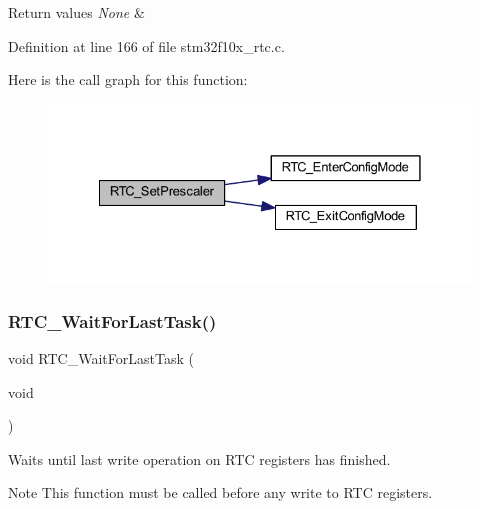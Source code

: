 \begin{DoxyRetVals}{Return values}
{\em None} & \\
\hline
\end{DoxyRetVals}


Definition at line 166 of file stm32f10x\+\_\+rtc.\+c.

Here is the call graph for this function\+:
\nopagebreak
\begin{figure}[H]
\begin{center}
\leavevmode
\includegraphics[width=328pt]{group___r_t_c___private___functions_gaf76be6071d1ba65b009e0791069e602c_cgraph}
\end{center}
\end{figure}
\mbox{\label{group___r_t_c___private___functions_gaa0a406ef860d5231748c5f0d82673036}} 
\subsubsection{\texorpdfstring{R\+T\+C\+\_\+\+Wait\+For\+Last\+Task()}{RTC\_WaitForLastTask()}}
{\footnotesize\ttfamily void R\+T\+C\+\_\+\+Wait\+For\+Last\+Task (\begin{DoxyParamCaption}\item[{void}]{ }\end{DoxyParamCaption})}



Waits until last write operation on R\+TC registers has finished. 

\begin{DoxyNote}{Note}
This function must be called before any write to R\+TC registers. 
\end{DoxyNote}

